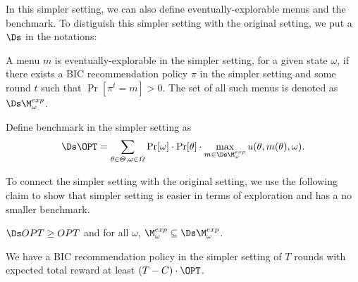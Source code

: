 In this simpler setting, we can also define eventually-explorable menus and the benchmark. To distiguish this simpler setting with the original setting, we put a $\Ds$ in the notations:

\begin{definition}
A menu $m$ is eventually-explorable in the simpler setting, for a given state $\omega$, if there exists a BIC recommendation policy $\pi$ in the simpler setting and some round $t$ such that $\Pr[\pi^t= m]> 0$. The set of all such menus is denoted as $\Ds\M_{\omega}^{exp}$.
\end{definition}

\begin{definition}[Benchmark]
Define benchmark in the simpler setting as 
\[
\Ds\OPT = \sum_{\theta \in \varTheta, \omega\in \varOmega} \Pr[\omega] \cdot \Pr[\theta] \cdot \max_{m \in \Ds\M_{\omega}^{exp}} u(\theta, m(\theta), \omega).
\]
\end{definition}

To connect the simpler setting with the original setting, we use the following claim to show that simpler setting is easier in terms of exploration and has a no smaller benchmark.
\begin{claim}
$\Ds OPT \geq OPT$ and for all $\omega$, $\M_{\omega}^{exp} \subseteq \Ds\M_{\omega}^{exp}$. 
\end{claim}

\begin{theorem}
\label{thm:private_noccd}
We have a BIC recommendation policy in the simpler setting of $T$ rounds with expected total reward at least $\left(T - C \right) \cdot \OPT$. 
\end{theorem}

